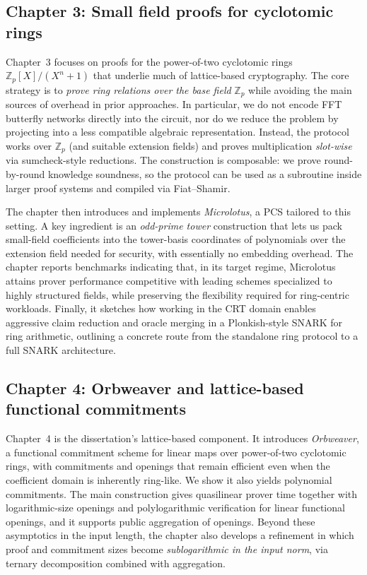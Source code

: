\subsection*{Chapter 3: Small field proofs for cyclotomic rings}

Chapter~3 focuses on proofs for the power-of-two cyclotomic rings $\mathbb{Z}_p[X]/(X^{n}+1)$ that underlie much of lattice-based cryptography. The core strategy is to \emph{prove ring relations over the base field} $\mathbb{Z}_p$ while avoiding the main sources of overhead in prior approaches. In particular, we do not encode FFT butterfly networks directly into the circuit, nor do we reduce the problem by projecting into a less compatible algebraic representation. Instead, the protocol works over $\mathbb{Z}_p$ (and suitable extension fields) and proves multiplication \emph{slot-wise} via sumcheck-style reductions. The construction is composable: we prove round-by-round knowledge soundness, so the protocol can be used as a subroutine inside larger proof systems and compiled via Fiat--Shamir.

The chapter then introduces and implements \emph{Microlotus}, a PCS tailored to this setting. A key ingredient is an \emph{odd-prime tower} construction that lets us pack small-field coefficients into the tower-basis coordinates of polynomials over the extension field needed for security, with essentially no embedding overhead. The chapter reports benchmarks indicating that, in its target regime, Microlotus attains prover performance competitive with leading schemes specialized to highly structured fields, while preserving the flexibility required for ring-centric workloads. Finally, it sketches how working in the CRT domain enables aggressive claim reduction and oracle merging in a Plonkish-style SNARK for ring arithmetic, outlining a concrete route from the standalone ring protocol to a full SNARK architecture.

\subsection*{Chapter 4: Orbweaver and lattice-based functional commitments}

Chapter~4 is the dissertation's lattice-based component. It introduces \emph{Orbweaver}, a functional commitment scheme for linear maps over power-of-two cyclotomic rings, with commitments and openings that remain efficient even when the coefficient domain is inherently ring-like. We show it also yields polynomial commitments. The main construction gives quasilinear prover time together with logarithmic-size openings and polylogarithmic verification for linear functional openings, and it supports public aggregation of openings. Beyond these asymptotics in the input length, the chapter also develops a refinement in which proof and commitment sizes become \emph{sublogarithmic in the input norm}, via ternary decomposition combined with aggregation.

